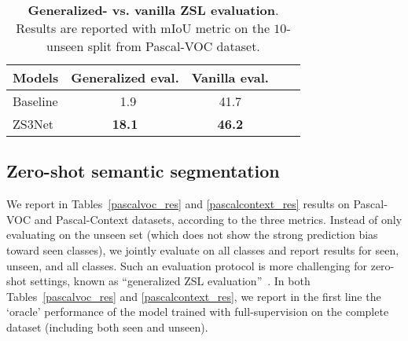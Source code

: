 \documentclass{article}
\begin{document}
\begin{SCtable}
\centering
\caption{\textbf{Generalized- vs. vanilla ZSL evaluation}. Results are reported with mIoU metric on the $10$-unseen split from Pascal-VOC dataset.}
\small{
\begin{tabular}{lccll}\toprule
Models &  Generalized eval. & Vanilla eval.  \\ \midrule[1.1pt]
Baseline   &        ~1.9     &    41.7       \\ \midrule
ZS3Net       &        \bf 18.1   & \bf 46.2  \\ \bottomrule
\end{tabular}
}
\vspace{-0.5cm}
\label{vanillia_zsc}
\end{SCtable}

\subsection{Zero-shot semantic segmentation}\label{sec:exp_results}
We report in Tables~\ref{pascalvoc_res} and \ref{pascalcontext_res} results on Pascal-VOC and Pascal-Context datasets, according to the three metrics.
Instead of only evaluating on the unseen set (which does not show the strong prediction bias toward seen classes), we jointly evaluate on all classes and report results for seen, unseen, and all classes.
Such an evaluation protocol is more challenging for zero-shot settings, known as ``generalized ZSL evaluation''~\cite{chao2016empirical}.
In both Tables~\ref{pascalvoc_res} and \ref{pascalcontext_res}, we report in the first line the `oracle' performance of the model trained with full-supervision on the complete dataset (including both seen and unseen).
\end{document}
